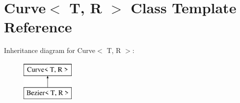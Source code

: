 \hypertarget{class_curve}{\section{Curve$<$ T, R $>$ Class Template Reference}
\label{class_curve}
}
Inheritance diagram for Curve$<$ T, R $>$\+:\begin{figure}[H]
\begin{center}
\leavevmode
\includegraphics[height=2.000000cm]{class_curve}
\end{center}
\end{figure}
